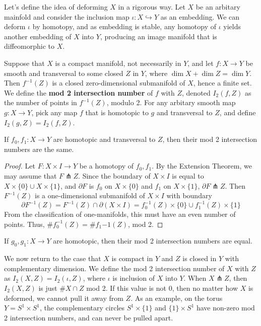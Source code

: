 Let's define the idea of deforming $X$ in a rigorous way. Let $X$ be an arbitary mainfold and consider the inclusion map $\iota: X \hookrightarrow Y$ as an embedding. We can deform $\iota$ by homotopy, and as embedding is stable, any homotopy of $\iota$ yields another embedding of $X$ into $Y$, producing an image manifold that is diffeomorphic to $X$. 

Suppose that $X$ is a compact manifold, not necessarily in $Y$, and let $f: X \to Y$ be smooth and transversal to some closed $Z$ in $Y$, where $\dim X + \dim Z = \dim Y$. Then $f^{-1}(Z)$ is a closed zero-dimensional submanifold of $X$, hence a finite set. We define the \textbf{mod 2 intersection number} of $f$ with $Z$, denoted $I_2(f,Z)$ as the number of points in $f^{-1}(Z)$, modulo 2. For any arbitary smooth map $g: X \to Y$, pick any map $f$ that is homotopic to $g$ and transversal to $Z$, and define $I_2(g,Z) = I_2(f,Z)$.

\begin{theorem}
    If $f_0,f_1: X \to Y$ are homotopic and transversal to $Z$, then their mod 2 intersection numbers are the same.
\end{theorem}

\begin{proof}
    Let $F: X \times I \to Y$ be a homotopy of $f_0,f_1$. By the Extension Theorem, we may assume that $F \pitchfork Z$. Since the boundary of $X \times I$ is equal to $X \times \{0\} \cup X \times \{1\}$, and $\partial F$ is $f_0$ on $X \times \{0\}$ and $f_1$ on $X \times \{1\}$, $\partial F \pitchfork Z$. Then $F^{-1}(Z)$ is a one-dimensional submanifold of $X \times I$ with boundary 
    \[\partial F^{-1}(Z) = F^{-1}(Z) \cap \partial (X \times I) = f_0^{-1}(Z) \times \{0\} \cup f_1^{-1}(Z) \times \{1\}\]
    From the classification of one-manifolds, this must have an even number of points. Thus, $\#f_0^{-1}(Z) = \#f_1{-1}(Z)$, mod 2.
\end{proof}

\begin{corollary}
    If $g_0,g_1: X \to Y$ are homotopic, then their mod 2 intersection numbers are equal.
\end{corollary}

We now return to the case that $X$ is compact in $Y$ and $Z$ is closed in $Y$ with complementary dimension. We define the mod 2 intersection number of $X$ with $Z$ as $I_2(X,Z) = I_2(\iota,Z)$, where $\iota$ is inclusion of $X$ into $Y$. When $X \pitchfork Z$, then $I_2(X,Z)$ is just $\#X \cap Z$ mod 2. If this value is not 0, then no matter how $X$ is deformed, we cannot pull it away from $Z$. As an example, on the torus $Y = S^1 \times S^1$, the complementary circles $S^1 \times \{1\}$ and $\{1\} \times S^1$ have non-zero mod 2 intersection numbers, and can never be pulled apart. 

